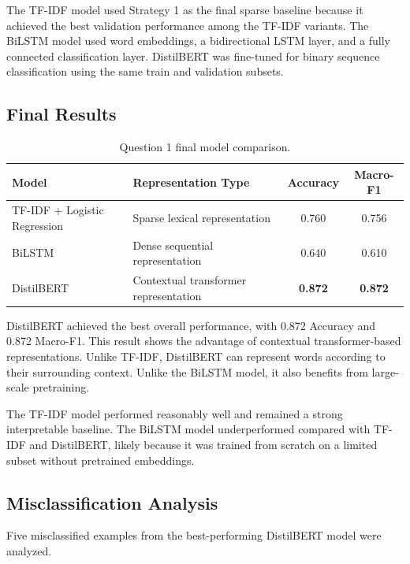\documentclass[11pt,a4paper]{article}
\begin{document}
The TF-IDF model used Strategy 1 as the final sparse baseline because it achieved the best validation performance among the TF-IDF variants. The BiLSTM model used word embeddings, a bidirectional LSTM layer, and a fully connected classification layer. DistilBERT was fine-tuned for binary sequence classification using the same train and validation subsets.

\subsection{Final Results}

\begin{table}[H]
\centering
\caption{Question 1 final model comparison.}
\begin{tabular}{p{4.5cm}p{5.5cm}cc}
\toprule
Model & Representation Type & Accuracy & Macro-F1 \\
\midrule
TF-IDF + Logistic Regression & Sparse lexical representation & 0.760 & 0.756 \\
BiLSTM & Dense sequential representation & 0.640 & 0.610 \\
DistilBERT & Contextual transformer representation & \textbf{0.872} & \textbf{0.872} \\
\bottomrule
\end{tabular}
\end{table}

DistilBERT achieved the best overall performance, with 0.872 Accuracy and 0.872 Macro-F1. This result shows the advantage of contextual transformer-based representations. Unlike TF-IDF, DistilBERT can represent words according to their surrounding context. Unlike the BiLSTM model, it also benefits from large-scale pretraining.

The TF-IDF model performed reasonably well and remained a strong interpretable baseline. The BiLSTM model underperformed compared with TF-IDF and DistilBERT, likely because it was trained from scratch on a limited subset without pretrained embeddings.

\subsection{Misclassification Analysis}

Five misclassified examples from the best-performing DistilBERT model were analyzed.
\end{document}
